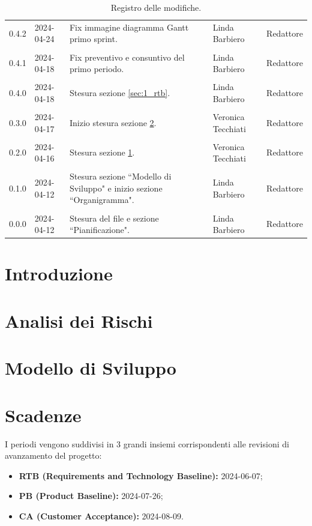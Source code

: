 \documentclass[8pt]{article}
\begin{document}
\begin{table}[ht!]
\begin{tabular}{p{1.2cm} p{2cm} p{6cm} p{3cm} p{2cm}}
		0.4.2 & 2024-04-24 & Fix immagine diagramma Gantt primo sprint. & Linda Barbiero & Redattore \\\\
		0.4.1 & 2024-04-18 & Fix preventivo e consuntivo del primo periodo. & Linda Barbiero & Redattore \\\\
		0.4.0 & 2024-04-18 & Stesura sezione \ref{sec:1_rtb}. & Linda Barbiero & Redattore \\\\
		0.3.0 & 2024-04-17 & Inizio stesura sezione \ref{sec:rischi}. & Veronica Tecchiati & Redattore \\\\
		0.2.0 & 2024-04-16 & Stesura sezione \ref{sec:intro}. & Veronica Tecchiati & Redattore \\\\
		0.1.0 & 2024-04-12 & Stesura sezione ``Modello di Sviluppo" e inizio sezione ``Organigramma". & Linda Barbiero & Redattore \\\\
		0.0.0 & 2024-04-12 & Stesura del file e sezione ``Pianificazione". & Linda Barbiero &
		Redattore \\
		\bottomrule
	\end{tabular}
	\caption{Registro delle modifiche.}
	\label{table:Registro delle modifiche}
\end{table}
\newpage
{\hypersetup{hidelinks} \tableofcontents}
\clearpage
\newpage
\newpage
{\hypersetup{hidelinks} \listoffigures}
\newpage
{\hypersetup{hidelinks} \listoftables}
\newpage
\justifying
\section{Introduzione} \label{sec:intro}

\section{Analisi dei Rischi} \label{sec:rischi}

\section{Modello di Sviluppo}

\newpage
\section{Scadenze}
I periodi vengono suddivisi in 3 grandi insiemi corrispondenti alle revisioni di avanzamento del progetto:
\begin{itemize}
\setlength\itemsep{0em}
\item \textbf{RTB (Requirements and Technology Baseline):} 2024-06-07;
\item \textbf{PB (Product Baseline):} 2024-07-26;
\item \textbf {CA (Customer Acceptance):} 2024-08-09.
\end{itemize}
\end{document}
